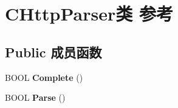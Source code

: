 \hypertarget{class_c_http_parser}{}\section{C\+Http\+Parser类 参考}
\label{class_c_http_parser}
\subsection*{Public 成员函数}
\begin{DoxyCompactItemize}
\item 
\mbox{\label{class_c_http_parser_af32a54518f4729e4e097faf2c0dddc89}} 
B\+O\+OL {\bfseries Complete} ()
\item 
\mbox{\label{class_c_http_parser_a00c84c857863c4738c19467a6dbaa650}} 
B\+O\+OL {\bfseries Parse} ()
\end{DoxyCompactItemize}
